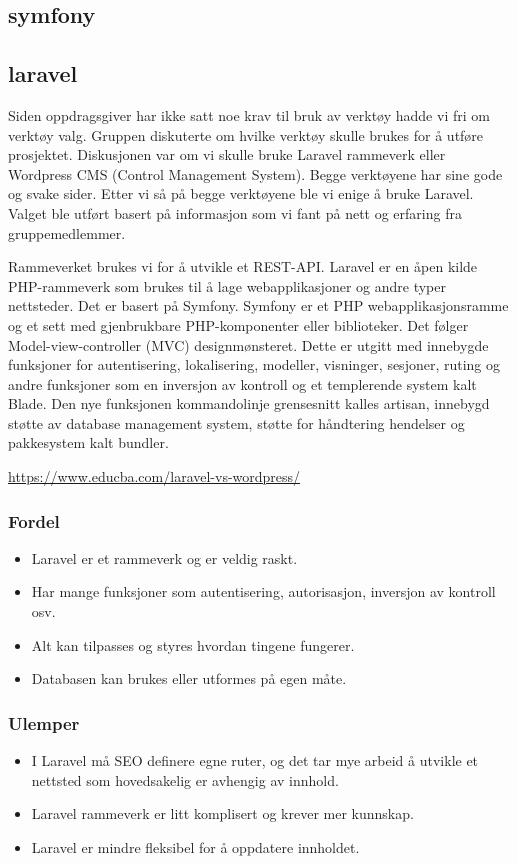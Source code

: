 \subsection{symfony}
\subsection{laravel}
Siden oppdragsgiver har ikke satt noe krav til bruk av verktøy hadde vi fri om verktøy valg. Gruppen diskuterte om hvilke verktøy skulle brukes for å utføre prosjektet. Diskusjonen var om vi skulle bruke Laravel rammeverk eller Wordpress CMS (Control Management System). Begge verktøyene har sine gode og svake sider.  Etter vi så på begge verktøyene ble vi enige å bruke Laravel. Valget ble utført basert på informasjon som vi fant på nett og erfaring fra gruppemedlemmer. 

Rammeverket brukes vi for å utvikle et REST-API. 
Laravel er en åpen kilde PHP-rammeverk som brukes til å lage webapplikasjoner og andre typer nettsteder. Det er basert på Symfony. Symfony er et PHP webapplikasjonsramme og et sett med gjenbrukbare PHP-komponenter eller biblioteker. Det følger Model-view-controller (MVC) designmønsteret.  Dette er utgitt med innebygde funksjoner for autentisering, lokalisering, modeller, visninger, sesjoner, ruting og andre funksjoner som en inversjon av kontroll og et templerende system kalt Blade. Den nye funksjonen kommandolinje grensesnitt kalles artisan, innebygd støtte av database management system, støtte for håndtering hendelser og pakkesystem kalt bundler.

\url{https://www.educba.com/laravel-vs-wordpress/}

\subsubsection{Fordel}
\begin{itemize}
\item Laravel er et rammeverk og er veldig raskt.
\item Har mange funksjoner som autentisering, autorisasjon, inversjon av kontroll osv.
\item Alt kan tilpasses og styres hvordan tingene fungerer.
\item Databasen kan brukes eller utformes på egen måte.
\end{itemize}

\subsubsection{Ulemper}
\begin{itemize}
\item I Laravel må SEO definere egne ruter, og det tar mye arbeid å utvikle et nettsted som hovedsakelig er avhengig av innhold.
\item Laravel rammeverk er litt komplisert og krever mer kunnskap.
\item Laravel er mindre fleksibel for å oppdatere innholdet.
\end{itemize}

